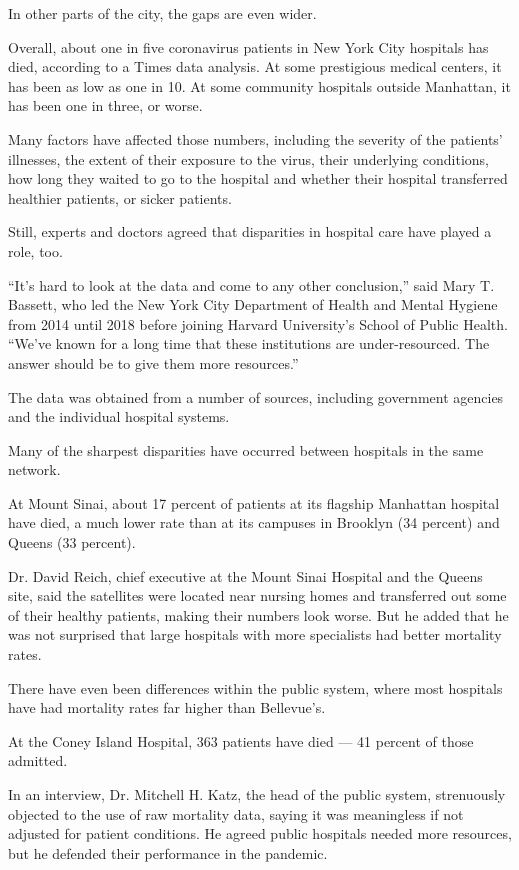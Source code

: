 In other parts of the city, the gaps are even wider.

Overall, about one in five coronavirus patients in New York City
hospitals has died, according to a Times data analysis. At some
prestigious medical centers, it has been as low as one in 10. At some
community hospitals outside Manhattan, it has been one in three, or
worse.

Many factors have affected those numbers, including the severity of the
patients' illnesses, the extent of their exposure to the virus, their
underlying conditions, how long they waited to go to the hospital and
whether their hospital transferred healthier patients, or sicker
patients.

Still, experts and doctors agreed that disparities in hospital care have
played a role, too.

``It's hard to look at the data and come to any other conclusion,'' said
Mary T. Bassett, who led the New York City Department of Health and
Mental Hygiene from 2014 until 2018 before joining Harvard University's
School of Public Health. ``We've known for a long time that these
institutions are under-resourced. The answer should be to give them more
resources.''

The data was obtained from a number of sources, including government
agencies and the individual hospital systems.

Many of the sharpest disparities have occurred between hospitals in the
same network.

At Mount Sinai, about 17 percent of patients at its flagship Manhattan
hospital have died, a much lower rate than at its campuses in Brooklyn
(34 percent) and Queens (33 percent).

Dr. David Reich, chief executive at the Mount Sinai Hospital and the
Queens site, said the satellites were located near nursing homes and
transferred out some of their healthy patients, making their numbers
look worse. But he added that he was not surprised that large hospitals
with more specialists had better mortality rates.

There have even been differences within the public system, where most
hospitals have had mortality rates far higher than Bellevue's.

At the Coney Island Hospital, 363 patients have died --- 41 percent of
those admitted.

In an interview, Dr. Mitchell H. Katz, the head of the public system,
strenuously objected to the use of raw mortality data, saying it was
meaningless if not adjusted for patient conditions. He agreed public
hospitals needed more resources, but he defended their performance in
the pandemic.

